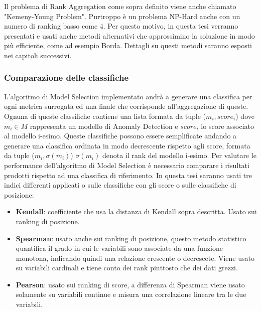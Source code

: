 Il problema di Rank Aggregation come sopra definito viene anche chiamato "Kemeny-Young Problem"\cite{pmlr-v54-korba17a}. Purtroppo è un problema NP-Hard anche con un numero di ranking basso come 4\cite{inproceedingsrankagg}. Per questo motivo, in questa tesi verranno presentati e usati anche metodi alternativi che approssimino la soluzione in modo più efficiente, come ad esempio Borda\cite{borda}. Dettagli su questi metodi saranno esposti nei capitoli successivi.

\subsubsection{Comparazione delle classifiche}
L'algoritmo di Model Selection implementato andrà a generare una classifica per ogni metrica surrogata ed una finale che corrisponde all'aggregazione di queste. Ognuna di queste classifiche contiene una lista formata da tuple (\(m_i, score_i\)) dove $m_i \in M $ rappresenta un modello di Anomaly Detection e $score_i$ lo score associato al modello i-esimo.
Queste classifiche possono essere semplificate andando a generare una classifica ordinata in modo decrescente rispetto agli score, formata da tuple (\(m_i, \sigma(m_i)\)) $\sigma(m_i)$ denota il rank del modello i-esimo.
Per valutare le performance dell'algoritmo di Model Selection è necessario comparare i risultati prodotti rispetto ad una classifica di riferimento.
In questa tesi saranno usati tre indici differenti applicati o sulle classifiche con gli score o sulle classifiche di posizione:

\begin{itemize}
	\item \textbf{Kendall}: coefficiente che usa la distanza di Kendall sopra descritta. Usato sui ranking di posizione.
	\item \textbf{Spearman}: usato anche sui ranking di posizione, questo metodo statistico quantifica il grado in cui le variabili sono associate da una funzione monotona, indicando quindi una relazione crescente o decrescete. Viene usato su variabili cardinali e tiene conto dei rank piuttosto che dei dati grezzi.
	\item \textbf{Pearson}: usato sui ranking di score, a differenza di Spearman viene usato solamente su variabili continue e misura una correlazione lineare tra le due variabili.
\end{itemize}
